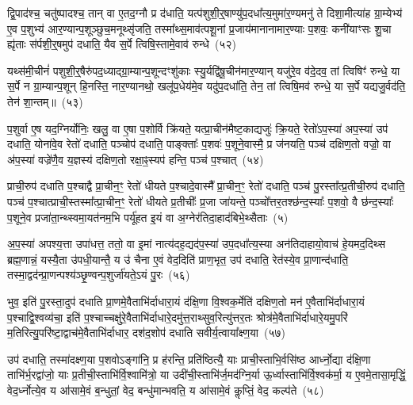 द्वि॒पाद॑श्च॒ चतु॑ष्पादश्च॒ तान् वा ए॒तद॒ग्नौ प्र द॑धाति॒ यत्प॑शुशी॒र्॒\mbox{}षाण्यु॑प॒दधा᳚त्य॒मुमा॑र॒ण्यमनु॑ ते दिशा॒मीत्या॑ह ग्रा॒म्येभ्य॑ ए॒व प॒शुभ्य॑ आर॒ण्यान्प॒शूञ्छुच॒मनूथ्सृ॑जति॒ तस्मा᳚थ्स॒माव॑त्पशू॒नां प्र॒जाय॑मानानामार॒ण्याः प॒शवः॒ कनी॑याꣳसः शु॒चा ह्यृ॑ताः स॑र्पशी॒र्॒\mbox{}षमुप॑ दधाति॒ यैव स॒र्पे त्विषि॒स्तामे॒वाव॑ रुन्धे~(५२)

यथ्स॑मी॒चीनं॑ पशुशी॒र्॒\mbox{}षैरु॑पद॒ध्याद्ग्रा॒म्यान्प॒शून्दꣳशु॑काः स्यु॒र्यद्वि॑षू॒चीन॑मार॒ण्यान् यजु॑रे॒व व॑दे॒दव॒ तां त्विषिꣳ॑ रुन्धे॒ या स॒र्पे न ग्रा॒म्यान्प॒शून् हि॒नस्ति॒ नार॒ण्यानथो॒ खलू॑प॒धेय॑मे॒व यदु॑प॒दधा॑ति॒ तेन॒ तां त्विषि॒मव॑ रुन्धे॒ या स॒र्पे यद्यजु॒र्वद॑ति॒ तेन॑ शा॒न्तम्॥~(५३)

{\anuvakamend[{ऊ॒नान्तस्योप॑ प्रा॒णाः स्या॒दिति॒ वै प॒शवो॑ रुन्धे॒ चतु॑श्चत्वारिꣳशच्च}]}%

प॒शुर्वा ए॒ष यद॒ग्निर्योनिः॒ खलु॒ वा ए॒षा प॒शोर्वि क्रि॑यते॒ यत्प्रा॒चीन॑मैष्ट॒काद्यजुः॑ क्रि॒यते॒ रेतो॑\-ऽप॒स्या॑ अप॒स्या॑ उप॑ दधाति॒ योना॑वे॒व रेतो॑ दधाति॒ पञ्चोप॑ दधाति॒ पाङ्क्ताः᳚ प॒शवः॑ प॒शूने॒वास्मै॒ प्र ज॑नयति॒ पञ्च॑ दक्षिण॒तो वज्रो॒ वा अ॑प॒स्या॑ वज्रे॑णै॒व य॒ज्ञस्य॑ दक्षिण॒तो रक्षा॒ꣴ॒स्यप॑ हन्ति॒ पञ्च॑ प॒श्चात्~(५४)

प्राची॒रुप॑ दधाति प॒श्चाद्वै प्रा॒चीन॒ꣳ॒ रेतो॑ धीयते प॒श्चादे॒वास्मै᳚ प्रा॒चीन॒ꣳ॒ रेतो॑ दधाति॒ पञ्च॑ पु॒रस्ता᳚त्प्र॒तीची॒रुप॑ दधाति॒ पञ्च॑ प॒श्चात्प्राची॒स्तस्मा᳚त्प्रा॒चीन॒ꣳ॒ रेतो॑ धीयते प्र॒तीचीः᳚ प्र॒जा जा॑यन्ते॒ पञ्चो᳚त्तर॒तश्छ॑न्द॒स्याः᳚ प॒शवो॒ वै छ॑न्द॒स्याः᳚ प॒शूने॒व प्रजा॑ता॒न्थ्स्वमा॒यत॑नम॒भि पर्यू॑हत इ॒यं वा अ॒ग्नेर॑तिदा॒हाद॑बिभे॒थ्सैताः~(५)

अ॒प॒स्या॑ अपश्य॒त्ता उपा॑धत्त॒ ततो॒ वा इ॒मां नात्य॑दह॒द्यद॑प॒स्या॑ उप॒दधा᳚त्य॒स्या अन॑तिदाहायो॒वाच॑ हे॒यमद॒दिथ्स ब्रह्म॒णान्नं॒ यस्यै॒ता उ॑पधी॒यान्तै॒ य उ॑ चैना ए॒वं वेद॒दिति॑ प्राण॒भृत॒ उप॑ दधाति॒ रेत॑स्ये॒व प्रा॒णान्द॑धाति॒ तस्मा॒द्वद॑न्प्रा॒णन्पश्य॑ञ्छृ॒ण्वन्प॒शुर्जा॑यते॒\-ऽयं पु॒रः~(५६)

भुव॒ इति॑ पु॒रस्ता॒दुप॑ दधाति प्रा॒णमे॒वैताभि॑र्दाधारा॒यं द॑क्षि॒णा वि॒श्वक॒र्मेति॑ दक्षिण॒तो मन॑ ए॒वैताभि॑र्दाधारा॒यं प॒श्चाद्वि॒श्वव्य॑चा॒ इति॑ प॒श्चाच्चक्षु॑रे॒वैताभि॑र्दाधारे॒दमु॑त्त॒राथ्सुव॒रित्यु॑त्तर॒तः श्रोत्र॑मे॒वैताभि॑र्दाधारे॒यमु॒परि॑ म॒तिरित्यु॒परि॑ष्टा॒द्वाच॑मे॒वैताभि॑र्दाधार॒ दश॑द॒शोप॑ दधाति सवीर्य॒त्वाया᳚क्ष्ण॒या~(५७)

उप॑ दधाति॒ तस्मा॑दक्ष्ण॒या प॒शवो\-ऽङ्गा॑नि॒ प्र ह॑रन्ति॒ प्रति॑ष्ठित्यै॒ याः प्राची॒स्ताभि॒र्वसि॑ष्ठ आर्ध्नो॒द्या द॑क्षि॒णा ताभि॑र्भ॒रद्वा॑जो॒ याः प्र॒तीची॒स्ताभि॑र्वि॒श्वामि॑त्रो॒ या उदी॑ची॒स्ताभि॑र्ज॒मद॑ग्नि॒र्या ऊ॒र्ध्वास्ताभि॑र्वि॒श्वक॑र्मा॒ य ए॒वमे॒तासा॒मृद्धिं॒ वेद॒र्ध्नोत्ये॒व य आ॑सामे॒वं ब॒न्धुतां॒ वेद॒ बन्धु॑मान्भवति॒ य आ॑सामे॒वं कॢप्तिं॒ वेद॒ कल्प॑ते~(५८)

